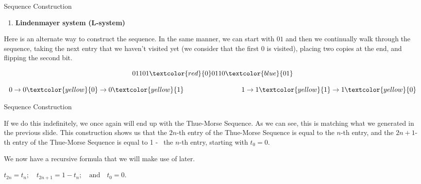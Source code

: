 \documentclass{beamer}
\begin{document}
\begin{frame}{Sequence Construction}
    \begin{enumerate}[2]
    \item \textbf{\large Lindenmayer system (L-system)}
    \end{enumerate}
    \vspace{0.5cm}
    Here is an alternate way to construct the sequence. In the same manner, we can start with $01$ and then we continually walk through the sequence, taking the next entry that we haven't visited yet (we consider that the first $0$ is visited), placing two copies at the end, and flipping the second bit. 

    \[
    01101\textcolor{red}{0}0110\textcolor{blue}{01}
    \]

    \[
        0 \rightarrow 0\textcolor{yellow}{0} \rightarrow 0\textcolor{yellow}{1} \hspace{3cm} 1 \rightarrow 1\textcolor{yellow}{1} \rightarrow 1\textcolor{yellow}{0}
    \]

\end{frame}

\begin{frame}{Sequence Construction}
    
    If we do this indefinitely, we once again will end up with the Thue-Morse Sequence. As we can see, this is matching what we generated in the previous slide. This construction shows us that the \( 2n \)-th entry of the Thue-Morse Sequence is equal to the \( n \)-th entry, and the \( 2n+1 \)-th entry of the Thue-Morse Sequence is equal to  1 - \ the \( n \)-th entry, starting with \( t_0 = 0 \).
    
    We now have a recursive formula that we will make use of later.


    \begin{center}
        \( t_{2n} = t_n; \quad t_{2n+1} = 1 - t_n; \quad \text{and} \quad t_0 = 0. \)
    \end{center}
\end{frame}
\end{document}
